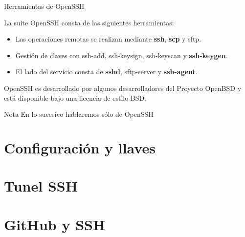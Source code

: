 \begin{frame}[c]{Herramientas de OpenSSH}

  La suite OpenSSH consta de las siguientes herramientas:

  \begin{itemize}
    \item Las operaciones remotas se realizan mediante \textbf{ssh},
      \textbf{scp} y sftp.
    \pausa
    \item Gestión de claves con ssh-add, ssh-keysign, ssh-keyscan
      y \textbf{ssh-keygen}.
    \pausa
    \item El lado del servicio consta de \textbf{sshd}, sftp-server
      y \textbf{ssh-agent}.
  \end{itemize}

  \pausa
  \vspace{\baselineskip}
  OpenSSH es desarrollado por algunos desarrolladores del Proyecto OpenBSD
  y está disponible bajo una licencia de estilo BSD. 

  \vspace{\baselineskip}
  \begin{exampleblock}{Nota}
    En lo sucesivo hablaremos sólo de OpenSSH
  \end{exampleblock}
\end{frame}

\section{Configuración y llaves}

\section{Tunel SSH}

\section{GitHub y SSH}

